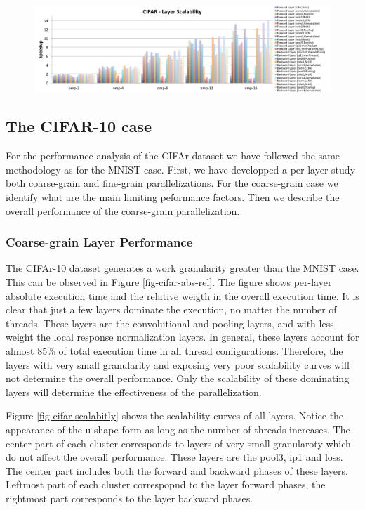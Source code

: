 \begin{figure}[]
\includegraphics[width=\textwidth]{figures/cifar-scalability-layer.pdf}
\caption{}
\end{figure}

\subsection{The CIFAR-10 case}
For the performance analysis of the CIFAr dataset we have followed the 
same methodology as for the MNIST case. First, we have developped a 
per-layer study both coarse-grain and fine-grain parallelizations. 
For the coarse-grain case we identify what are the main limiting 
peformance factors. Then we describe the overall performance of the 
coarse-grain parallelization. 

\subsubsection{Coarse-grain Layer Performance}
The CIFAr-10 dataset generates a work granularity greater than 
the MNIST case. This can be observed in Figure \ref{fig-cifar-abs-rel}. 
The figure shows per-layer absolute execution time and the relative 
weigth in the overall execution time. It is clear that just a few 
layers dominate the execution, no matter the number of threads. 
These layers are the convolutional and pooling layers, and with 
less weight the local response normalization layers. In general, 
these layers account for almost 85\% of total execution time in 
all thread configurations. Therefore, the layers with very small 
granularity and exposing very poor scalability curves will not 
determine the overall performance. Only the scalability of these 
dominating layers will determine the effectiveness of the 
parallelization.

Figure \ref{fig-cifar-scalabitly} shows the scalability curves of all layers. 
Notice the appearance of the u-shape form as long as the number of threads 
increases. The center part of each cluster corresponds to layers of very 
small granularoty which do not affect the overall performance. These layers 
are the pool3, ip1 and loss. The center part includes both the forward 
and backward phases of these layers. Leftmost part of each cluster 
correspopnd to the layer forward phases, the rightmost part corresponds 
to the layer backward phases.

